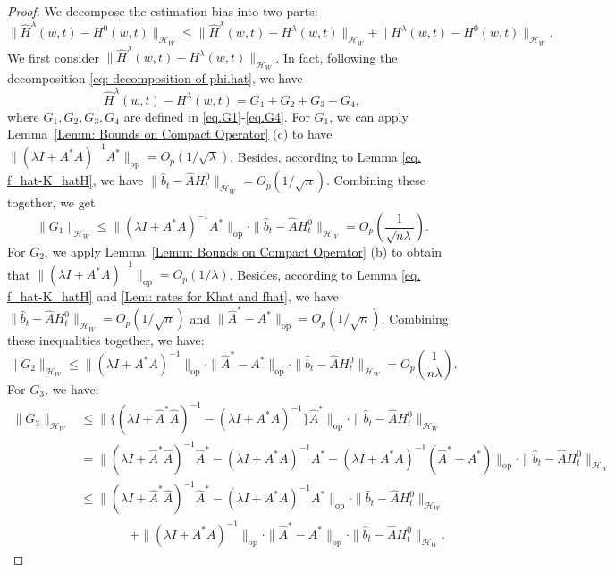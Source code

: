 \documentclass[
  12pt]{article}
\begin{document}
\begin{proof}
    We decompose the estimation bias into two parts:
    $$
    \|\widehat{H}^{\lambda}(w,t)-H^0(w,t)\|_{\mathcal{H}_{W}}\leq\|\widehat{H}^{\lambda}(w,t)-H^{\lambda}(w,t)\|_{\mathcal{H}_{W}}+\|H^{\lambda}(w,t)-H^0(w,t)\|_{\mathcal{H}_{W}}.
    $$
    We first consider $\|\widehat{H}^{\lambda}(w,t)-H^{\lambda}(w,t)\|_{\mathcal{H}_{W}}$. In fact, following the decomposition \eqref{eq: decomposition of phi.hat}, we have
    $$
    \widehat{H}^{\lambda}(w,t)-H^\lambda(w,t)=G_1+G_2+G_3+G_4,
    $$
    where $G_1,G_2,G_3,G_4$ are defined in \eqref{eq.G1}-\eqref{eq.G4}. For $G_1$, we can apply Lemma~\ref{Lemm: Bounds on Compact Operator} (c) to have $\| (\lambda I+A^*A)^{-1}A^*\|_{\mathrm{op}}=O_p(1/\sqrt{\lambda})$. Besides, according to Lemma \ref{eq. f_hat-K_hatH}, we have $\| \widehat{b}_t-\widehat{A}H^0_t\|_{\mathcal{H}_W}=O_p(1/\sqrt{n})$. Combining these together, we get
    $$
    \|G_1\|_{\mathcal{H}_W}\le \| (\lambda I+A^*A)^{-1}A^*\|_{\mathrm{op}}\cdot \| \widehat{b}_t-\widehat{A}H^0_t\|_{\mathcal{H}_W}= O_p\left( \frac{1}{\sqrt{n\lambda}} \right). 
    $$
    For $G_2$, we apply Lemma~\ref{Lemm: Bounds on Compact Operator} (b) to obtain that $\| (\lambda I+A^*A)^{-1}\|_{\mathrm{op}}=O_p(1/\lambda)$. Besides, according to Lemma \ref{eq. f_hat-K_hatH} and \ref{Lem: rates for Khat and fhat}, we have $\| \widehat{b}_t-\widehat{A}H^0_t\|_{\mathcal{H}_W}=O_p(1/\sqrt{n})$ and $\| \widehat{A}^*-A^*\|_{\mathrm{op}}=O_p(1/\sqrt{n})$. Combining these inequalities together, we have:
    $$
\| G_2\|_{\mathcal{H}_W}\le \| (\lambda I+A^*A)^{-1}\|_{\mathrm{op}}\cdot \| \widehat{A}^*-A^*\|_{\mathrm{op}}\cdot \| \widehat{b}_t-\widehat{A}H^0_t\|_{\mathcal{H}_W}= O_p\left( \frac{1}{n\lambda} \right).
$$
For $G_3$, we have:
\begin{align*}
	\|G_3\|_{\mathcal{H}_W}&\le \| \{(\lambda I+\widehat{A}^*\widehat{A})^{-1}-(\lambda I+A^*A)^{-1}\}\widehat{A}^*\|_{\mathrm{op}}\cdot \| \widehat{b}_t-\widehat{A}H^0_t\|_{\mathcal{H}_W}\\
	&= \| (\lambda I+\widehat{A}^*\widehat{A})^{-1}\widehat{A}^*-(\lambda I+A^*A)^{-1}A^*-(\lambda I+A^*A)^{-1}(\widehat{A}^*-A^*)\|_{\mathrm{op}}\cdot \| \widehat{b}_t-\widehat{A}H^0_t\|_{\mathcal{H}_W}\\
	&\le \| (\lambda I+\widehat{A}^*\widehat{A})^{-1}\widehat{A}^*-(\lambda I+A^*A)^{-1}A^*\|_{\mathrm{op}}\cdot \| \widehat{b}_t-\widehat{A}H^0_t\|_{\mathcal{H}_W}\\
	& \qquad \qquad +\| (\lambda I+A^*A)^{-1}\|_{\mathrm{op}}\cdot \| \widehat{A}^*-A^*\|_{\mathrm{op}}\cdot \| \widehat{b}_t-\widehat{A}H^0_t\|_{\mathcal{H}_W}.

\end{align*}
\end{proof}
\end{document}
